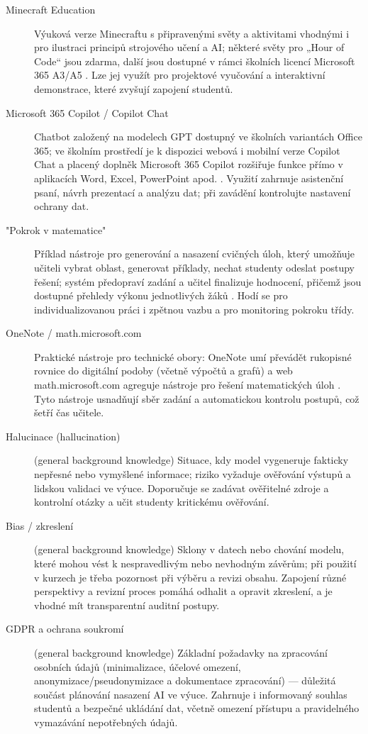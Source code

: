 \begin{description}
  \item[Minecraft Education] Výuková verze Minecraftu s připravenými světy a aktivitami vhodnými i pro ilustraci principů strojového učení a AI; některé světy pro „Hour of Code“ jsou zdarma, další jsou dostupné v rámci školních licencí Microsoft 365 A3/A5 \cite{kb_ai_101_tipu_pdf_04e4a115_page_15_2}. Lze jej využít pro projektové vyučování a interaktivní demonstrace, které zvyšují zapojení studentů.
  \item[Microsoft 365 Copilot / Copilot Chat] Chatbot založený na modelech GPT dostupný ve školních variantách Office 365; ve školním prostředí je k dispozici webová i mobilní verze Copilot Chat a placený doplněk Microsoft 365 Copilot rozšiřuje funkce přímo v aplikacích Word, Excel, PowerPoint apod. \cite{kb_ai_101_tipu_pdf_04e4a115_page_3_1}. Využití zahrnuje asistenční psaní, návrh prezentací a analýzu dat; při zavádění kontrolujte nastavení ochrany dat.
  \item["Pokrok v matematice"] Příklad nástroje pro generování a nasazení cvičných úloh, který umožňuje učiteli vybrat oblast, generovat příklady, nechat studenty odeslat postupy řešení; systém předopraví zadání a učitel finalizuje hodnocení, přičemž jsou dostupné přehledy výkonu jednotlivých žáků \cite{kb_ai_101_tipu_pdf_04e4a115_page_8_1}. Hodí se pro individualizovanou práci i zpětnou vazbu a pro monitoring pokroku třídy.
  \item[OneNote / math.microsoft.com] Praktické nástroje pro technické obory: OneNote umí převádět rukopisné rovnice do digitální podoby (včetně výpočtů a grafů) a web math.microsoft.com agreguje nástroje pro řešení matematických úloh \cite{kb_ai_101_tipu_pdf_04e4a115_page_8_1}. Tyto nástroje usnadňují sběr zadání a automatickou kontrolu postupů, což šetří čas učitele.
  \item[Halucinace (hallucination)] (general background knowledge) Situace, kdy model vygeneruje fakticky nepřesné nebo vymyšlené informace; riziko vyžaduje ověřování výstupů a lidskou validaci ve výuce. Doporučuje se zadávat ověřitelné zdroje a kontrolní otázky a učit studenty kritickému ověřování.
  \item[Bias / zkreslení] (general background knowledge) Sklony v datech nebo chování modelu, které mohou vést k nespravedlivým nebo nevhodným závěrům; při použití v kurzech je třeba pozornost při výběru a revizi obsahu. Zapojení různé perspektivy a revizní proces pomáhá odhalit a opravit zkreslení, a je vhodné mít transparentní auditní postupy.
  \item[GDPR a ochrana soukromí] (general background knowledge) Základní požadavky na zpracování osobních údajů (minimalizace, účelové omezení, anonymizace/pseudonymizace a dokumentace zpracování) — důležitá součást plánování nasazení AI ve výuce. Zahrnuje i informovaný souhlas studentů a bezpečné ukládání dat, včetně omezení přístupu a pravidelného vymazávání nepotřebných údajů.
\end{description}

